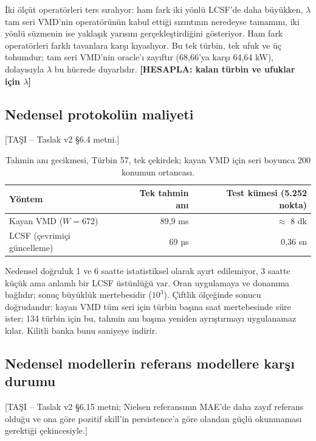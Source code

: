 \documentclass[11pt,a4paper]{article}
\newcommand{\hesapla}[1]{\textbf{[HESAPLA: #1]}}
\newcommand{\tasi}[1]{\textsf{\small [TAŞI -- #1]}}
\begin{document}
İki ölçüt operatörleri ters sıralıyor: ham fark iki yönlü LCSF'de daha büyükken,
$\lambda$ tam seri VMD'nin operatörünün kabul ettiği sızıntının neredeyse
tamamını, iki yönlü süzmenin ise yaklaşık yarısını gerçekleştirdiğini gösteriyor.
Ham fark operatörleri farklı tavanlara karşı kıyaslıyor. Bu tek türbin, tek ufuk
ve üç tohumdur; tam seri VMD'nin oracle'ı zayıftır (68,66'ya karşı 64,64 kW),
dolayısıyla $\lambda$ bu hücrede duyarlıdır.
\hesapla{kalan türbin ve ufuklar için $\lambda$}

\subsection{Nedensel protokolün maliyeti}
\tasi{Taslak v2 §6.4 metni.}

\begin{table}[htbp]\centering
\caption{Tahmin anı gecikmesi, Türbin 57, tek çekirdek; kayan VMD için seri
boyunca 200 konumun ortancası.}
\footnotesize
\begin{tabular}{lrr}
\toprule
Yöntem & Tek tahmin anı & Test kümesi (5.252 nokta) \\
\midrule
Kayan VMD ($W=672$)        & 89,9 ms & $\approx$ 8 dk \\
LCSF (çevrimiçi güncelleme) & 69 µs  & 0,36 sn \\
\bottomrule
\end{tabular}
\end{table}

Nedensel doğruluk 1 ve 6 saatte istatistiksel olarak ayırt edilemiyor, 3 saatte
küçük ama anlamlı bir LCSF üstünlüğü var. Oran uygulamaya ve donanıma bağlıdır;
sonuç büyüklük mertebesidir ($10^3$). Çiftlik ölçeğinde sonucu doğrudandır: kayan
VMD tüm seri için türbin başına saat mertebesinde süre ister; 134 türbin için bu,
tahmin anı başına yeniden ayrıştırmayı uygulanamaz kılar. Kilitli banka bunu
saniyeye indirir.

\subsection{Nedensel modellerin referans modellere karşı durumu}
\tasi{Taslak v2 §6.15 metni; Nielsen referansının MAE'de daha zayıf referans
olduğu ve ona göre pozitif skill'in persistence'a göre olandan güçlü
okunmaması gerektiği çekincesiyle.}
\end{document}
